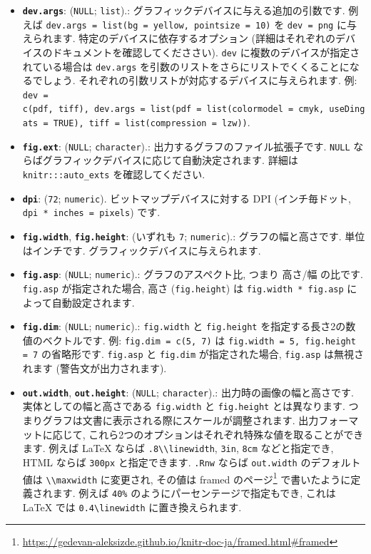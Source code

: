 \documentclass[
  11pt,
]{bxjsreport}
\providecommand{\tightlist}{%
  \setlength{\itemsep}{0pt}\setlength{\parskip}{0pt}}
\renewcommand{\href}[2]{#2\footnote{\url{#1}}}
\begin{document}
\begin{itemize}
\tightlist
\item
  \textbf{\texttt{dev.args}}: (\texttt{NULL}; \texttt{list}).: グラフィックデバイスに与える追加の引数です. 例えば \texttt{dev.args = list(bg = \textquotesingle{}yellow\textquotesingle{},\ pointsize\ =\ 10)} を \texttt{dev = \textquotesingle{}png\textquotesingle{}} に与えられます. 特定のデバイスに依存するオプション (詳細はそれぞれのデバイスのドキュメントを確認してくだささい). \texttt{dev} に複数のデバイスが指定されている場合は \texttt{dev.args} を引数のリストをさらにリストでくくることになるでしょう. それぞれの引数リストが対応するデバイスに与えられます. 例: \texttt{dev = c(\textquotesingle{}pdf\textquotesingle{},\ \textquotesingle{}tiff\textquotesingle{}),\ dev.args\ =\ list(pdf\ =\ list(colormodel\ =\ \textquotesingle{}cmyk\textquotesingle{},\ useDingats\ =\ TRUE),\ tiff\ =\ list(compression\ =\ \textquotesingle{}lzw\textquotesingle{}))}.
\item
  \textbf{\texttt{fig.ext}}: (\texttt{NULL}; \texttt{character}).: 出力するグラフのファイル拡張子です. \texttt{NULL} ならばグラフィックデバイスに応じて自動決定されます. 詳細は \texttt{knitr:::auto\_exts} を確認してください.
\item
  \textbf{\texttt{dpi}}: (\texttt{72}; \texttt{numeric}). ビットマップデバイスに対する DPI (インチ毎ドット, \texttt{dpi * inches = pixels}) です.
\item
  \textbf{\texttt{fig.width}}, \textbf{\texttt{fig.height}}: (いずれも \texttt{7}; \texttt{numeric}).: グラフの幅と高さです. 単位はインチです. グラフィックデバイスに与えられます.
\item
  \textbf{\texttt{fig.asp}}: (\texttt{NULL}; \texttt{numeric}).: グラフのアスペクト比, つまり 高さ/幅 の比です. \texttt{fig.asp} が指定された場合, 高さ (\texttt{fig.height}) は \texttt{fig.width * fig.asp} によって自動設定されます.
\item
  \textbf{\texttt{fig.dim}}: (\texttt{NULL}; \texttt{numeric}).: \texttt{fig.width} と \texttt{fig.height} を指定する長さ2の数値のベクトルです. 例: \texttt{fig.dim = c(5, 7)} は \texttt{fig.width = 5, fig.height = 7} の省略形です. \texttt{fig.asp} と \texttt{fig.dim} が指定された場合, \texttt{fig.asp} は無視されます (警告文が出力されます).
\item
  \textbf{\texttt{out.width}}, \textbf{\texttt{out.height}}: (\texttt{NULL}; \texttt{character}).: 出力時の画像の幅と高さです. 実体としての幅と高さである \texttt{fig.width} と \texttt{fig.height} とは異なります. つまりグラフは文書に表示される際にスケールが調整されます. 出力フォーマットに応じて, これら2つのオプションはそれぞれ特殊な値を取ることができます. 例えば LaTeX ならば \texttt{.8\textbackslash{}\textbackslash{}linewidth}, \texttt{3in}, \texttt{8cm} などと指定でき, HTML ならば \texttt{300px} と指定できます. \texttt{.Rnw} ならば \texttt{out.width} のデフォルト値は \texttt{\textbackslash{}\textbackslash{}maxwidth} に変更され, その値は \href{https://gedevan-aleksizde.github.io/knitr-doc-ja/framed.html\#framed}{framed のページ} で書いたように定義されます. 例えば \texttt{\textquotesingle{}40\%\textquotesingle{}} のようにパーセンテージで指定もでき, これは LaTeX では \texttt{0.4\textbackslash{}linewidth} に置き換えられます.

\end{itemize}
\end{document}
